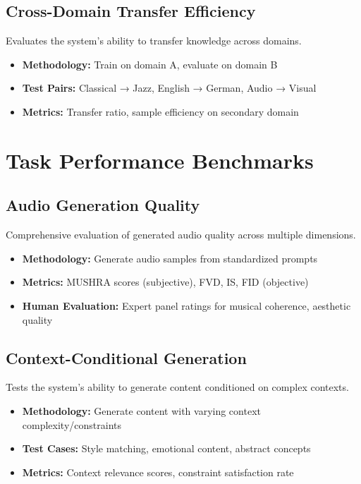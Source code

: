 \subsection{Cross-Domain Transfer Efficiency}

Evaluates the system's ability to transfer knowledge across domains.

\begin{itemize}
    \item \textbf{Methodology:} Train on domain A, evaluate on domain B
    \item \textbf{Test Pairs:} Classical → Jazz, English → German, Audio → Visual
    \item \textbf{Metrics:} Transfer ratio, sample efficiency on secondary domain
\end{itemize}

\section{Task Performance Benchmarks}

\subsection{Audio Generation Quality}

Comprehensive evaluation of generated audio quality across multiple dimensions.

\begin{itemize}
    \item \textbf{Methodology:} Generate audio samples from standardized prompts
    \item \textbf{Metrics:} MUSHRA scores (subjective), FVD, IS, FID (objective)
    \item \textbf{Human Evaluation:} Expert panel ratings for musical coherence, aesthetic quality
\end{itemize}

\subsection{Context-Conditional Generation}

Tests the system's ability to generate content conditioned on complex contexts.

\begin{itemize}
    \item \textbf{Methodology:} Generate content with varying context complexity/constraints
    \item \textbf{Test Cases:} Style matching, emotional content, abstract concepts
    \item \textbf{Metrics:} Context relevance scores, constraint satisfaction rate
\end{itemize}

